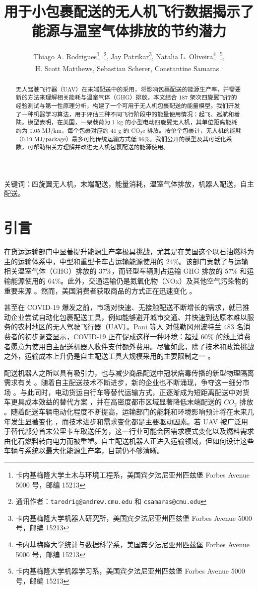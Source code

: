 \documentclass{article}
\title{用于小包裹配送的无人机飞行数据揭示了能源与温室气体排放的节约潜力}
\author{Thiago A. Rodrigues\thanks{卡内基梅隆大学土木与环境工程系，美国宾夕法尼亚州匹兹堡 Forbes Avenue 5000 号，邮编 15213} \textsuperscript{,}\thanks{通讯作者：{\tt\small{tarodrig@andrew.cmu.edu}} 和 {\tt\small{csamaras@cmu.edu}}}, \;Jay Patrikar\thanks{卡内基梅隆大学机器人研究所，美国宾夕法尼亚州匹兹堡 Forbes Avenue 5000 号，邮编 15213}, \;Natalia L. Oliveira\thanks{卡内基梅隆大学统计与数据科学系，美国宾夕法尼亚州匹兹堡 Forbes Avenue 5000 号，邮编 15213} \textsuperscript{,}\thanks{卡内基梅隆大学机器学习系，美国宾夕法尼亚州匹兹堡 Forbes Avenue 5000 号，邮编 15213}, \\H. Scott Matthews\footnotemark[1], \;Sebastian Scherer\footnotemark[3], \;Constantine Samaras \footnotemark[1] \textsuperscript{,} \footnotemark[2]
}
\date{}
\begin{document}
\maketitle

\begin{abstract}
无人驾驶飞行器（UAV）在末端配送中的采用，将影响包裹配送的能源生产率，并需要新的方法来理解相关能耗与温室气体（GHG）排放。本文结合 187 架次四旋翼飞行的经验测试与第一性原理分析，构建了一个可用于无人机包裹配送的能量模型。我们开发了一种机器学习算法，用于评估三种不同飞行阶段中的能量使用情况：起飞、巡航和着陆。模型表明，在美国，一架载荷为 1 kg 的小型电动四旋翼无人机，其单位距离能耗约为 0.05 MJ/km，每个包裹对应约 41 g 的 CO$_{2}$e 排放。按单个包裹计，无人机的能耗（0.19 MJ/package）最多可比传统运输方式低 96\%。我们公开的模型及其可泛化系数，可帮助相关方理解并改进无人机包裹配送的能源使用。
\end{abstract}

关键词：四旋翼无人机，末端配送，能量消耗，温室气体排放，机器人配送，自主配送。

\section{引言}

在货运运输部门中显著提升能源生产率极具挑战，尤其是在美国这个以石油燃料为主的运输体系中，中型和重型卡车占运输能源使用的 24\%。该部门贡献了与运输相关温室气体（GHG）排放的 37\%，而轻型车辆则占运输 GHG 排放的 57\% 和运输能源使用的 64\%。此外，交通运输仍是氮氧化物（NOx）及其他空气污染物的重要来源 \cite{Davis2021Transportation39}。然而，美国消费者获取商品的方式正在迅速变化 \cite{Dost2018}。

甚至在 COVID-19 爆发之前，市场对快速、无接触配送不断增长的需求，就已推动企业尝试自动化包裹配送工具，例如能够避开城市交通、并快速到达原本难以服务的农村地区的无人驾驶飞行器（UAV）\cite{Mims2020, Lee2020TheFuture}。Pani 等人 \cite{Pani2020EvaluatingPandemic} 对俄勒冈州波特兰 483 名消费者的初步调查显示，COVID-19 正在促成这样一种环境：超过 60\% 的线上消费者愿意为使用自主配送机器人收件支付额外费用。尽管如此，除了技术和政策挑战之外，运输成本上升仍是自主配送工具大规模采用的主要限制之一 \cite{Kapser2020AcceptancePerceptions}。

配送机器人之所以具有吸引力，也与减少商品配送中冠状病毒传播的新型物理隔离需求有关 \cite{Abrar2020AnSystem}。随着自主配送技术不断进步，新的企业也不断涌现，争夺这一细分市场 \cite{Joerss2016HowMcKinsey, Bensinger2016AmazonsFedEx, Gross2013, Murphy2016, UPS2017}。与此同时，电动货运自行车等替代运输方式，正逐渐成为短距离配送中对货车更具成本效益的替代方案 \cite{Sheth2019MeasuringAreas}，并在高密度都市区域显著降低末端配送的 $CO_2$ 排放 \cite{McLeod2020QuantifyingDelivery}。随着配送车辆电动化程度不断提高，运输部门的能耗和环境影响预计将在未来几年发生显著变化 \cite{Gebeloff2017, Dominkovic2018TheTransition}，而技术进步和需求变化都是主要驱动因素。若 UAV 被广泛用于替代部分首末公里卡车取送任务，这一行业可能会因需求模式变化以及燃料需求由化石燃料转向电力而被重塑。自主配送机器人正进入运输领域，但如何设计这些车辆与系统以最大化能源生产率，目前仍不够清晰。
\end{document}
